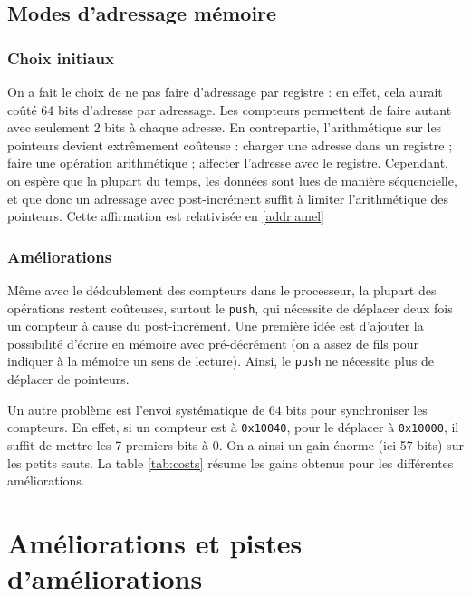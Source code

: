 \documentclass[architecture]{compas2018}
\begin{document}


\iffalse
\subsection{Modes d'adressage mémoire}
\subsubsection{Choix initiaux}
On a fait le choix de ne pas faire d'adressage par registre : en effet, cela aurait coûté 64 bits d'adresse par adressage. Les compteurs permettent de faire autant avec seulement 2 bits à chaque adresse. En contrepartie, l'arithmétique sur les pointeurs devient extrêmement coûteuse : charger une adresse dans un registre ; faire une opération arithmétique ; affecter l'adresse avec le registre. Cependant, on espère que la plupart du temps, les données sont lues de manière séquencielle, et que donc un adressage avec post-incrément suffit à limiter l'arithmétique des pointeurs. Cette affirmation est relativisée en \ref{addr:amel}  
\subsubsection{Améliorations\label{addr:amel}}
Même avec le dédoublement des compteurs dans le processeur, la plupart des opérations restent coûteuses, surtout le \texttt{push}, qui nécessite de déplacer deux fois un compteur à cause du post-incrément. Une première idée est d'ajouter la possibilité d'écrire en mémoire avec pré-décrément (on a assez de fils pour indiquer à la mémoire un sens de lecture). Ainsi, le \texttt{push} ne nécessite plus de déplacer de pointeurs.\par
Un autre problème est l'envoi systématique de $64$ bits pour synchroniser les compteurs. En effet, si un compteur est à \texttt{0x10040}, pour le déplacer à \texttt{0x10000}, il suffit de mettre les 7 premiers bits à 0. On a ainsi un gain énorme (ici 57 bits) sur les petits sauts. La table \ref{tab:costs} résume les gains obtenus pour les différentes améliorations.


\section{Améliorations et pistes d'améliorations \label{sec:amelioration}}
\end{document}
